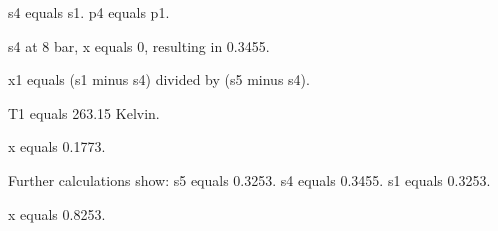 s4 equals s1.  
p4 equals p1.  

s4 at 8 bar, x equals 0, resulting in 0.3455.  

x1 equals (s1 minus s4) divided by (s5 minus s4).  

T1 equals 263.15 Kelvin.  

x equals 0.1773.  

Further calculations show:  
s5 equals 0.3253.  
s4 equals 0.3455.  
s1 equals 0.3253.  

x equals 0.8253.